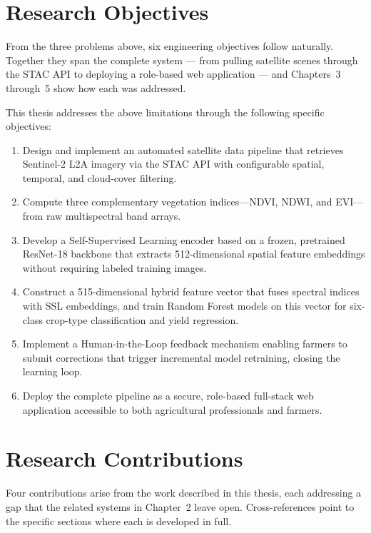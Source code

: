 \documentclass[12pt,a4paper,oneside]{report}
\begin{document}
\section{Research Objectives}

From the three problems above, six engineering objectives follow naturally. Together they span the complete system — from pulling satellite scenes through the STAC API to deploying a role-based web application — and Chapters~3 through~5 show how each was addressed.

This thesis addresses the above limitations through the following specific objectives:

\begin{enumerate}
  \item Design and implement an automated satellite data pipeline that retrieves
        Sentinel-2 L2A imagery via the STAC API with configurable spatial, temporal,
        and cloud-cover filtering.
  \item Compute three complementary vegetation indices—NDVI, NDWI, and EVI—from
        raw multispectral band arrays.
  \item Develop a Self-Supervised Learning encoder based on a frozen, pretrained
        ResNet-18 backbone that extracts 512-dimensional spatial feature embeddings
        without requiring labeled training images.
  \item Construct a 515-dimensional hybrid feature vector that fuses spectral indices
        with SSL embeddings, and train Random Forest models on this vector for
        six-class crop-type classification and yield regression.
  \item Implement a Human-in-the-Loop feedback mechanism enabling farmers to submit
        corrections that trigger incremental model retraining, closing the
        learning loop.
  \item Deploy the complete pipeline as a secure, role-based full-stack web
        application accessible to both agricultural professionals and farmers.
\end{enumerate}

\section{Research Contributions}

Four contributions arise from the work described in this thesis, each addressing a gap that the related systems in Chapter~2 leave open. Cross-references point to the specific sections where each is developed in full.
\end{document}
